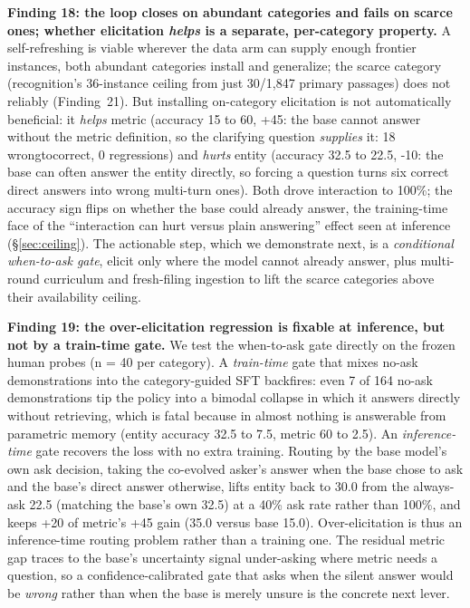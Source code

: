\textbf{Finding 18: the loop closes on abundant categories and fails on scarce ones;
whether elicitation \emph{helps} is a separate, per-category property.} A self-refreshing
\fininteract is viable wherever the data arm can supply enough frontier
instances, both abundant categories install and generalize; the scarce category
(recognition's 36-instance ceiling from just 30/1,847 primary passages) does
not reliably (Finding~21). But installing on-category elicitation is not automatically beneficial: it
\emph{helps} metric (accuracy 15 to 60, +45: the base cannot answer without the
metric definition, so the clarifying question \emph{supplies} it: 18
wrongtocorrect, 0 regressions) and \emph{hurts} entity (accuracy 32.5 to 22.5,
-10: the base can often answer the entity directly, so forcing a question turns
six correct direct answers into wrong multi-turn ones). Both drove interaction to
100\%; the accuracy sign flips on whether the base could already answer, the
training-time face of the ``interaction can hurt versus plain answering'' effect
seen at inference (\S\ref{sec:ceiling}). The actionable step, which we demonstrate
next, is a \emph{conditional when-to-ask gate}, elicit only where the model cannot
already answer, plus multi-round curriculum and fresh-filing ingestion to lift the
scarce categories above their availability ceiling.

\textbf{Finding 19: the over-elicitation regression is fixable at inference, but
not by a train-time gate.} We test the when-to-ask gate directly on the frozen human
probes (n = 40 per category). A \emph{train-time} gate that mixes no-ask demonstrations
into the category-guided SFT backfires: even 7 of 164 no-ask demonstrations tip the
policy into a bimodal collapse in which it answers directly without retrieving, which
is fatal because in \fininteract almost nothing is answerable from parametric memory
(entity accuracy 32.5 to 7.5, metric 60 to 2.5). An \emph{inference-time} gate
recovers the loss with no extra training. Routing by the base model's own ask
decision, taking the co-evolved asker's answer when the base chose to ask and the
base's direct answer otherwise, lifts entity back to 30.0 from the always-ask
22.5 (matching the base's own 32.5) at a 40\% ask rate rather than 100\%, and
keeps +20 of metric's +45 gain (35.0 versus base 15.0). Over-elicitation is
thus an inference-time routing problem rather than a training one. The residual
metric gap traces to the base's uncertainty signal under-asking where metric needs a
question, so a confidence-calibrated gate that asks when the silent answer would be
\emph{wrong} rather than when the base is merely unsure is the concrete next lever.

